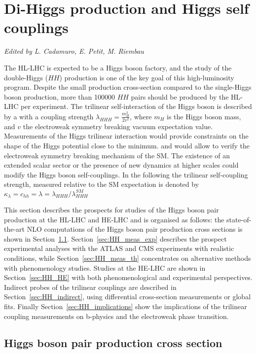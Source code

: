 \documentclass[../report.tex]{subfiles}
\begin{document}
\section{Di-Higgs production and Higgs self couplings\label{sec3}}
\begin{center}{\it Edited by L. Cadamuro, E. Petit, M. Riembau} \end{center}

The HL-LHC is expected to be a Higgs boson factory, and the study of the double-Higgs ($HH$) production is one of the key goal of this high-luminosity program. Despite the small production cross-section compared to the single-Higgs boson production, more than 100000 $HH$ pairs should be produced by the HL-LHC per experiment. The trilinear self-interaction of the Higgs boson is described by a with a coupling strength $\lambda_{HHH}  = \frac{m_H^2}{2v^2} $, where $m_H$ is the Higgs boson mass, and $v$ the electroweak symmetry breaking vacuum expectation value. Measurements of the Higgs trilinear interaction would provide constraints on the shape of the Higgs potential close to the minimum. and would allow to verify the electroweak symmetry breaking mechanism of the SM.
The existence of an extended scalar sector or the presence of new dynamics at higher scales could modify the Higgs boson self-couplings.
In the following the trilinear self-coupling strength, measured relative to the SM expectation is denoted by $\kappa_{\lambda} = c_{hh} = \lambda = \lambda_{HHH}/\lambda_{HHH}^{SM}$

This section describes the prospects for studies of the Higgs boson pair production at the HL-LHC and HE-LHC and is organised as follows: the state-of-the-art NLO computations of the Higgs boson pair production cross sections is shown in Section~\ref{sec:HH_NLO}. Section~\ref{sec:HH_meas_exp} describes the prospect experimental analyses with the ATLAS and CMS experiments with realistic conditions, while Section~\ref{sec:HH_meas_th} concentrates on alternative methods with phenomenology studies. Studies at the HE-LHC are shown in Section~\ref{sec:HH_HE} with both phenomenological and experimental perspectives. Indirect probes of the trilinear couplings are described in Section~\ref{sec:HH_indirect}, using differential cross-section measurements or global fits. Finally Section~\ref{sec:HH_implications} show the implications of the trilinear coupling measurements on b-physics and the electroweak phase transition.  

\subsection{Higgs boson pair production cross section}
\label{sec:HH_NLO}
\end{document}
